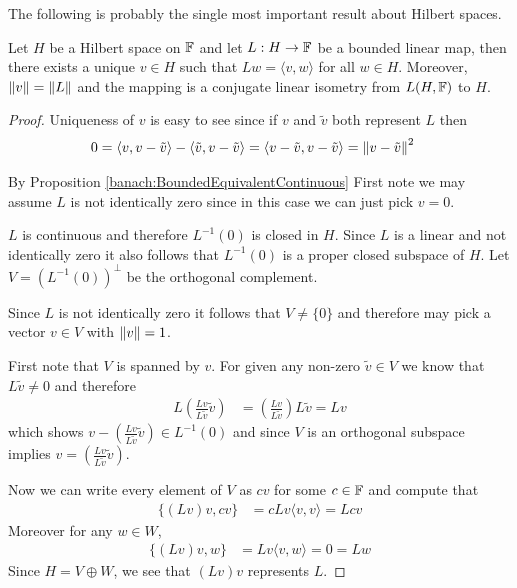 The following is probably the single most important result about
Hilbert spaces.
\begin{thm}\label{hilbert:RieszTheorem}Let $H$ be a Hilbert space on
  $\mathbb{F}$ and let $L : H \to \mathbb{F}$ be a bounded linear map, then
  there exists a unique $v \in H$ such that $L w = \langle v, w
  \rangle$ for all $w \in H$.   Moreover, $\left \lVert v \right \rVert = \left \lVert L \right \rVert$ and
  the mapping is a conjugate linear isometry from $L(H, \mathbb{F})$ to $H$.
\end{thm}
\begin{proof}
Uniqueness of $v$ is easy to see since if $v$ and $\tilde{v}$ both
represent $L$ then
\begin{align*}
  0 &= \langle v, v - \tilde{v} \rangle - \langle \tilde{v}, v -
      \tilde{v} \rangle = \langle v - \tilde{v}, v - \tilde{v} \rangle
      = \left \lVert v -\tilde{v} \right \rVert^2
\end{align*}

By Proposition \ref{banach:BoundedEquivalentContinuous} First note we
may assume $L$ is not identically zero since in this case we can just pick $v
= 0$.

$L$ is
continuous and therefore $L^{-1}( 0)$ is closed in $H$.   Since $L$ is a
linear and not identically zero it also follows that $L^{-1}( 0)$ is a
proper closed subspace of $H$.  Let $V = \left(L^{-1}( 0)\right)^\perp$ be the orthogonal complement.   

Since $L$ is not
identically zero it follows that $V \neq \lbrace 0 \rbrace$ and
therefore may pick a vector $v \in V$ with $\left \lVert v \right \rVert = 1$.

First note that $V$ is spanned by $v$.   For given any non-zero $\tilde{v} \in
V$ we know that $L \tilde{v} \neq 0$ and therefore
\begin{align*}
  L \left( \frac{Lv}{L \tilde{v}} \tilde{v} \right)  &=   \left(
\frac{Lv}{L\tilde{v}}\right) L\tilde{v} =  L v
\end{align*}
which shows $v - \left( \frac{Lv}{L \tilde{v}} \tilde{v} \right) \in
L^{-1}(0)$ and since $V$ is an orthogonal subspace implies $v =\left(
  \frac{Lv}{L \tilde{v}} \tilde{v} \right)$.

Now we can write every element of $V$ as $cv$ for some $c \in \mathbb{F}$
and compute that
\begin{align*}
  \lbrace \left(Lv\right) v, c v \rbrace &= c Lv \langle v, v \rangle = L cv
\end{align*}
Moreover for any $w \in W$,
\begin{align*}
  \lbrace \left(Lv\right) v, w \rbrace &= Lv \langle v, w \rangle = 0
                                         = Lw
\end{align*}
Since $H = V \oplus W$, we see that $\left(Lv\right) v$ represents
$L$.


\end{proof}
